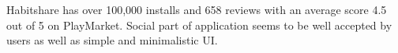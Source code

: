 Habitshare has over 100,000 installs and 658 reviews with an average score 4.5 out of 5 on PlayMarket.
Social part of application seems to be well accepted by users as well as simple and minimalistic UI\@.

%
%
%
%
%
%
%
%

